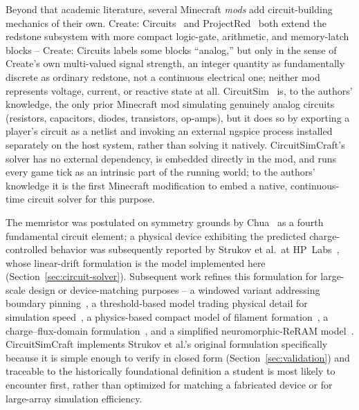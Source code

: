 Beyond that academic literature, several Minecraft \emph{mods} add circuit-building
mechanics of their own. Create: Circuits~\cite{chocoboyy2026createcircuits} and
ProjectRed~\cite{mrtjp2026projectred} both extend the redstone subsystem with more compact
logic-gate, arithmetic, and memory-latch blocks -- Create: Circuits labels some blocks
``analog,'' but only in the sense of Create's own multi-valued signal strength, an integer
quantity as fundamentally discrete as ordinary redstone, not a continuous electrical one;
neither mod represents voltage, current, or reactive state at all.
CircuitSim~\cite{dankov2026circuitsim} is, to the authors' knowledge, the only prior
Minecraft mod simulating genuinely analog circuits (resistors, capacitors, diodes,
transistors, op-amps), but it does so by exporting a player's circuit as a netlist and
invoking an external ngspice process installed separately on the host system, rather than
solving it natively. CircuitSimCraft's solver has no external dependency, is embedded directly
in the mod, and runs every game tick as an intrinsic part of the running world; to the
authors' knowledge it is the first Minecraft modification to embed a native, continuous-time
circuit solver for this purpose.

The memristor was postulated on symmetry grounds by Chua~\cite{chua1971memristor} as a
fourth fundamental circuit element; a physical device exhibiting the predicted
charge-controlled behavior was subsequently reported by Strukov et al.\ at
HP~Labs~\cite{strukov2008missing}, whose linear-drift formulation is the model implemented
here (Section~\ref{sec:circuit-solver}). Subsequent work refines this formulation for
large-scale design or device-matching purposes -- a windowed variant addressing boundary
pinning~\cite{biolek2009spice}, a threshold-based model trading physical detail for
simulation speed~\cite{kvatinsky2013team}, a physics-based compact model of filament
formation~\cite{guan2012compact}, a charge--flux-domain formulation~\cite{picos2015chargeflux},
and a simplified neuromorphic-ReRAM model~\cite{alchawa2020simple}. CircuitSimCraft implements
Strukov et al.'s original formulation specifically because it is simple enough to verify in
closed form (Section~\ref{sec:validation}) and traceable to the historically foundational
definition a student is most likely to encounter first, rather than optimized for matching a
fabricated device or for large-array simulation efficiency.
